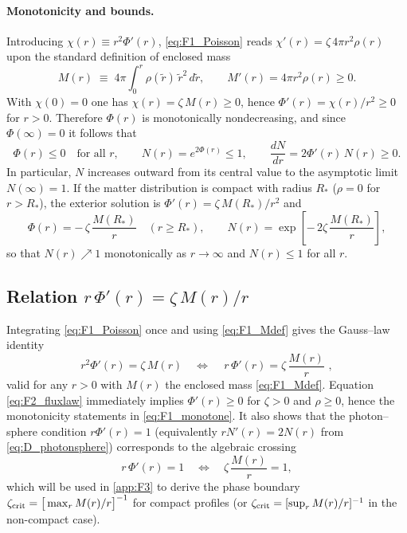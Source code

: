 \documentclass{iopjournal}
\begin{document}
\paragraph{Monotonicity and bounds.}
Introducing $\chi(r)\equiv r^{2}\Phi'(r)$, \eqref{eq:F1_Poisson} reads $\chi'(r)=\zeta\,4\pi r^{2}\rho(r)$ upon the standard definition of enclosed mass
\begin{equation}
M(r)\;\equiv\;4\pi\!\int_{0}^{r}\!\rho(\tilde r)\,\tilde r^{2}\,d\tilde r,\qquad M'(r)=4\pi r^{2}\rho(r)\ge0.
\label{eq:F1_Mdef}
\end{equation}
With $\chi(0)=0$ one has $\chi(r)=\zeta\,M(r)\ge0$, hence $\Phi'(r)=\chi(r)/r^{2}\ge0$ for $r>0$. Therefore $\Phi(r)$ is monotonically nondecreasing, and since $\Phi(\infty)=0$ it follows that
\begin{equation}
\Phi(r)\le 0\quad\text{for all }r,\qquad
N(r)=e^{2\Phi(r)}\le 1,\qquad \frac{dN}{dr}=2\Phi'(r)\,N(r)\ge0.
\label{eq:F1_monotone}
\end{equation}
In particular, $N$ increases outward from its central value to the asymptotic limit $N(\infty)=1$. If the matter distribution is compact with radius $R_\ast$ ($\rho=0$ for $r>R_\ast$), the exterior solution is $\Phi'(r)=\zeta\,M(R_\ast)/r^{2}$ and
\begin{equation}
\Phi(r)=-\,\zeta\,\frac{M(R_\ast)}{r}\quad (r\ge R_\ast),\qquad
N(r)=\exp\!\left[-\,2\zeta\,\frac{M(R_\ast)}{r}\right],
\label{eq:F1_ext}
\end{equation}
so that $N(r)\nearrow 1$ monotonically as $r\to\infty$ and $N(r)\le1$ for all $r$.

\subsection{\texorpdfstring{Relation $r\,\Phi'(r)=\zeta\,M(r)/r$}{Relation rΦ′(r)=ζ M(r)/r}}\label{app:F2}

Integrating \eqref{eq:F1_Poisson} once and using \eqref{eq:F1_Mdef} gives the Gauss–law identity
\begin{equation}
r^{2}\Phi'(r)=\zeta\,M(r)\quad\Longleftrightarrow\quad
\boxed{\,r\,\Phi'(r)=\zeta\,\frac{M(r)}{r}\,}\,,
\label{eq:F2_fluxlaw}
\end{equation}
valid for any $r>0$ with $M(r)$ the enclosed mass \eqref{eq:F1_Mdef}. Equation \eqref{eq:F2_fluxlaw} immediately implies $\Phi'(r)\ge0$ for $\zeta>0$ and $\rho\ge0$, hence the monotonicity statements in \eqref{eq:F1_monotone}. It also shows that the photon–sphere condition $r\Phi'(r)=1$ (equivalently $rN'(r)=2N(r)$ from \eqref{eq:D_photonsphere}) corresponds to the algebraic crossing
\begin{equation}
r\,\Phi'(r)=1
\quad\Longleftrightarrow\quad
\zeta\,\frac{M(r)}{r}=1,
\label{eq:F2_crossing}
\end{equation}
which will be used in \cref{app:F3} to derive the phase boundary $\zeta_{\rm crit}=\big[\max_{r} M(r)/r\big]^{-1}$ for compact profiles (or $\zeta_{\rm crit}=[\sup_{r} M(r)/r]^{-1}$ in the non-compact case).
\end{document}

